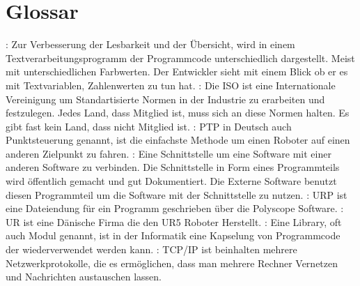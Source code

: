  \chapter{Glossar}
 \label{sec:Glossar_glo}

\begin{acronym}[]%
 
 : Zur Verbesserung der Lesbarkeit und der Übersicht, wird in einem Textverarbeitungsprogramm der Programmcode unterschiedlich dargestellt. Meist mit unterschiedlichen Farbwerten. Der Entwickler sieht mit einem Blick ob er es mit Textvariablen, Zahlenwerten zu tun hat.
 : Die ISO ist eine Internationale Vereinigung um Standartisierte Normen in der Industrie zu erarbeiten und festzulegen. Jedes Land, dass Mitglied ist, muss sich an diese Normen halten. Es gibt fast kein Land, dass nicht Mitglied ist.
 : PTP in Deutsch auch Punktsteuerung genannt, ist die einfachste Methode um einen Roboter auf einen anderen Zielpunkt zu fahren.
 : Eine Schnittstelle um eine Software mit einer anderen Software zu verbinden. Die Schnittstelle in Form eines Programmteils wird öffentlich gemacht und gut Dokumentiert. Die Externe Software benutzt diesen Programmteil um die Software mit der Schnittstelle zu nutzen.
 : URP ist eine Dateiendung für ein Programm geschrieben über die Polyscope Software.
 : UR ist eine Dänische Firma die den UR5 Roboter Herstellt.
 : Eine Library, oft auch Modul genannt, ist in der Informatik eine Kapselung von Programmcode der wiederverwendet werden kann.
 : TCP/IP ist beinhalten mehrere Netzwerkprotokolle, die es ermöglichen, dass man mehrere Rechner Vernetzen und Nachrichten austauschen lassen.
\end{acronym}

